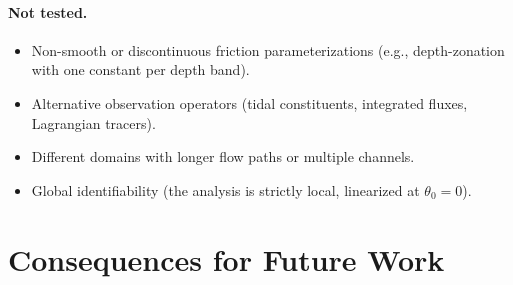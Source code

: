 \documentclass[11pt]{article}
\theoremstyle{definition}
\begin{document}
\paragraph{Not tested.}
\begin{itemize}
\item Non-smooth or discontinuous friction parameterizations
  (e.g., depth-zonation with one constant per depth band).
\item Alternative observation operators (tidal constituents,
  integrated fluxes, Lagrangian tracers).
\item Different domains with longer flow paths or multiple channels.
\item Global identifiability (the analysis is strictly local,
  linearized at $\theta_0 = 0$).
\end{itemize}

\section{Consequences for Future Work}
\label{sec:consequences}
\end{document}
